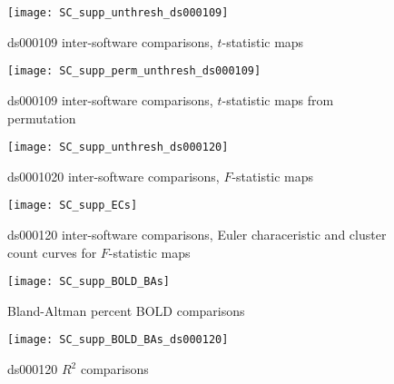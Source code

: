 \begin{figure}[htbp]
\centering
	\texttt{[image: SC\_supp\_unthresh\_ds000109]}	
\caption{ds000109 inter-software comparisons, $t$-statistic maps}
\label{fig:SC_supp_unthresh_ds000109}
\end{figure}

\begin{figure}[htbp]
\centering
	\texttt{[image: SC\_supp\_perm\_unthresh\_ds000109]}	
\caption{ds000109 inter-software comparisons, $t$-statistic maps from permutation}
\label{fig:SC_supp_perm_unthresh_ds000109}
\end{figure}

\begin{figure}[htbp]
\centering
	\texttt{[image: SC\_supp\_unthresh\_ds000120]}	
\caption{ds0001020 inter-software comparisons, $F$-statistic maps}
\label{fig:SC_supp_unthresh_ds000120}
\end{figure}

\begin{figure}[htbp]
\centering
	\texttt{[image: SC\_supp\_ECs]}	
\caption{ds000120 inter-software comparisons, Euler characeristic and cluster count curves for $F$-statistic maps}
\label{fig:SC_supp_ECs}
\end{figure}

\begin{figure}[htbp]
\centering
	\texttt{[image: SC\_supp\_BOLD\_BAs]}	
\caption{Bland-Altman percent BOLD comparisons}
\label{fig:SC_supp_BOLD_BAs}
\end{figure}


\begin{figure}[htbp]
\centering
	\texttt{[image: SC\_supp\_BOLD\_BAs\_ds000120]}	
\caption{ds000120 $R^{2}$ comparisons}
\label{fig:SC_supp_BOLD_BAs_ds000120}
\end{figure}






